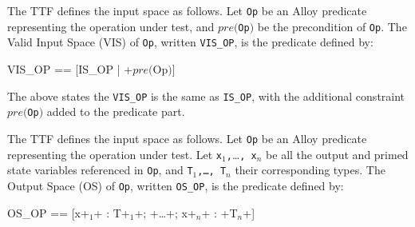 \begin{definition}
The TTF defines the input space as follows. Let \texttt{Op} be an Alloy predicate representing the operation under test, and $pre($\texttt{Op}$)$ be the precondition of \texttt{Op}. The Valid Input Space (VIS) of \texttt{Op}, written \texttt{VIS\_OP}, is the predicate defined by:

\lstset{aboveskip=3mm}
\lstset{language=}
\begin{alloy}[escapeinside={++}]
 VIS_OP == [IS_OP | +$pre($Op$)$]
\end{alloy}
\end{definition}

The above states the \texttt{VIS\_OP} is the same as \texttt{IS\_OP}, with the additional constraint $pre($\texttt{Op}$)$ added to the predicate part.

\begin{definition}
The TTF defines the input space as follows. Let \texttt{Op} be an Alloy predicate representing the operation under test. Let \verb+x+$_1$\verb+,+\ldots\verb+, x+$_n$ be all the output and primed state variables referenced in \texttt{Op}, and \texttt{T$_1$,\ldots, T$_n$} their corresponding types. The Output Space (OS) of \texttt{Op}, written \texttt{OS\_OP}, is the predicate defined by:

\lstset{aboveskip=3mm}
\lstset{language=}
\begin{alloy}[escapeinside={++}]
 OS_OP == [x+$_1$+ : T+$_1$+; +\ldots+; x+$_n$+ : +T$_n$+]
\end{alloy}
\end{definition}



